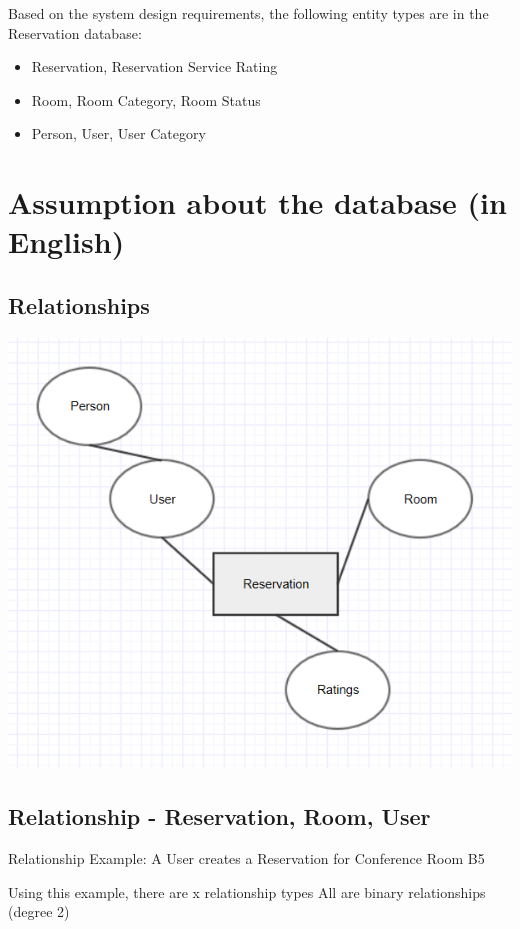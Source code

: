 \documentclass[11pt]{report}
\begin{document}
Based on the system design requirements, the following entity types are in the Reservation database:
\begin{itemize}
    \item Reservation,  Reservation Service Rating
    \item Room, Room Category, Room Status
    \item Person, User, User Category
\end{itemize}

\section*{Assumption about the database (in English)}
\subsection*{Relationships}
\begin{center}
\includegraphics{reservation_conceptual.PNG}
\end{center}
\pagebreak

\subsection*{Relationship - Reservation, Room, User}
Relationship Example: A User creates a Reservation for Conference Room B5

\setlength{\parindent}{5ex}
 Using this example, there are  x relationship types
 All are binary relationships (degree 2)
 
\end{document}
